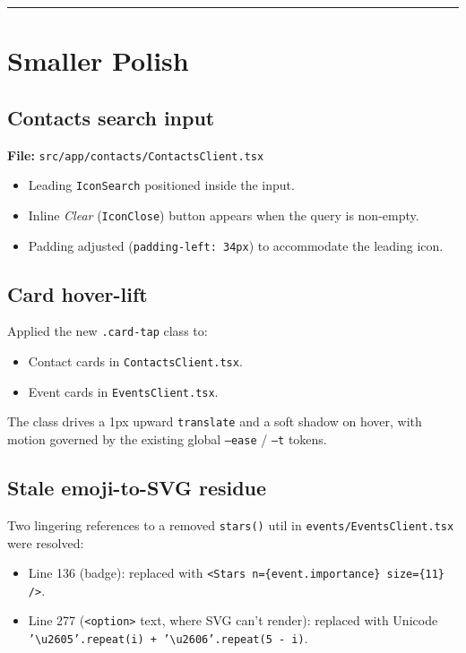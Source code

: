 \documentclass[11pt,a4paper]{article}
\begin{document}
\hrule
\bigskip

\section{Smaller Polish}

\subsection{Contacts search input}

\textbf{File:} \texttt{src/app/contacts/ContactsClient.tsx}

\begin{itemize}[leftmargin=*]
  \item Leading \texttt{IconSearch} positioned inside the input.
  \item Inline \emph{Clear} (\texttt{IconClose}) button appears when the
        query is non-empty.
  \item Padding adjusted (\texttt{padding-left: 34px}) to accommodate the
        leading icon.
\end{itemize}

\subsection{Card hover-lift}

Applied the new \texttt{.card-tap} class to:

\begin{itemize}[leftmargin=*]
  \item Contact cards in \texttt{ContactsClient.tsx}.
  \item Event cards in \texttt{EventsClient.tsx}.
\end{itemize}

The class drives a 1px upward \texttt{translate} and a soft shadow on
hover, with motion governed by the existing global
\texttt{--ease} / \texttt{--t} tokens.

\subsection{Stale emoji-to-SVG residue}

Two lingering references to a removed \texttt{stars()} util in
\texttt{events/EventsClient.tsx} were resolved:

\begin{itemize}[leftmargin=*]
  \item Line 136 (badge): replaced with
        \texttt{<Stars n=\{event.importance\} size=\{11\} />}.
  \item Line 277 (\texttt{<option>} text, where SVG can't render):
        replaced with Unicode
        \texttt{'\textbackslash u2605'.repeat(i) + '\textbackslash u2606'.repeat(5 - i)}.
\end{itemize}
\end{document}
